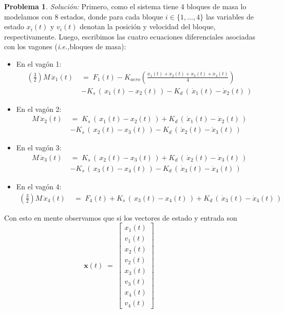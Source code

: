 \documentclass[ a4paper, twoside, 11pt]{article}
\newcommand{\ie}{\textit{i.e.,\;}}
\renewcommand{\vec}[1]{{\boldsymbol{#1}}}
\theoremstyle{definition}
\newtheorem{problem}[definition]{Problema}
\begin{document}
\begin{problem}
\emph{Soluci\'on:} Primero, como el sistema tiene 4 bloques de masa lo modelamos con 8 estados, donde para cada bloque $i \in \{ 1, \dots, 4 \}$ las variables de estado $x_i(t)$ y $v_i(t)$ denotan la posici\'on y velocidad del bloque, respectivamente. Luego, escribimos las cuatro ecuaciones diferenciales asociadas con los vagones (\ie bloques de masa): 
\begin{itemize}
\item En el vag\'on 1: 
\begin{align*}
\left( \frac{3}{2} \right) M \, \ddot{x}_1(t) \; 
& = \; F_1(t) - K_{aero} \left( \frac{\dot{x}_1(t) + \dot{x}_2(t) + \dot{x}_3(t) + \dot{x}_4(t)}{4} \right) \\
& - K_s \, ( \, x_1(t) - x_2(t) \, ) - K_d \, ( \, \dot{x}_1(t) - \dot{x}_2(t) \, )
\end{align*}
\item En el vag\'on 2: 
\begin{align*}
M \, \ddot{x}_2(t) \; 
& = \; K_s \, ( \, x_1(t) - x_2(t) \, ) + K_d \, ( \, \dot{x}_1(t) - \dot{x}_2(t) \, ) \\
& - K_s \, ( \, x_2(t) - x_3(t) \, ) - K_d \, ( \, \dot{x}_2(t) - \dot{x}_3(t) \, )
\end{align*}
\item En el vag\'on 3: 
\begin{align*}
M \, \ddot{x}_3(t) \; 
& = \; K_s \, ( \, x_2(t) - x_3(t) \, ) + K_d \, ( \, \dot{x}_2(t) - \dot{x}_3(t) \, ) \\
& - K_s \, ( \, x_3(t) - x_4(t) \, ) - K_d \, ( \, \dot{x}_3(t) - \dot{x}_4(t) \, )
\end{align*}
\item En el vag\'on 4: 
\begin{align*}
\left( \frac{3}{2} \right) M \, \ddot{x}_4(t) \; 
& = \; F_4(t) + K_s \, ( \, x_3(t) - x_4(t) \, ) + K_d \, ( \, \dot{x}_3(t) - \dot{x}_4(t) \, )
\end{align*}
\end{itemize}
Con esto en mente observamos que si los vectores de estado y entrada son 
\[
\vec{x}(t) \; = \; 
\left[ \begin{array}{c}
x_1(t) \\ v_1(t) \\
x_2(t) \\ v_2(t) \\
x_3(t) \\ v_3(t) \\
x_4(t) \\ v_4(t)
\end{array} \right] \qquad \qquad
\]
\end{problem}
\end{document}
